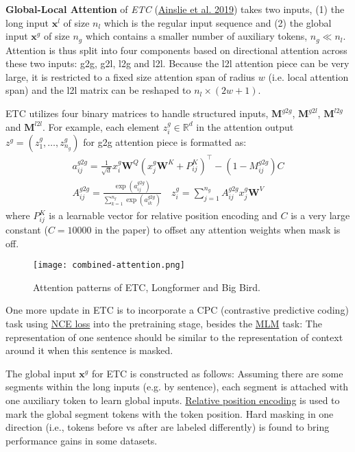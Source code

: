 \documentclass[12pt]{article}
\begin{document}
\textbf{Global-Local Attention} of \emph{ETC} (\href{https://aclanthology.org/2020.emnlp-main.19/}{Ainslie et al. 2019}) takes two inputs, (1) the long input $\mathbf{x}^l$ of size $n_l$ which is the regular input sequence and (2) the global input $\mathbf{x}^g$ of size $n_g$ which contains a smaller number of auxiliary tokens, $n_g \ll n_l$. Attention is thus split into four components based on directional attention across these two inputs: g2g, g2l, l2g and l2l. Because the l2l attention piece can be very large, it is restricted to a fixed size attention span of radius $w$ (i.e. local attention span) and the l2l matrix can be reshaped to $n_l \times (2w+1)$.

ETC utilizes four binary matrices to handle structured inputs, $\mathbf{M}^{g2g}$, $\mathbf{M}^{g2l}$, $\mathbf{M}^{l2g}$ and $\mathbf{M}^{l2l}$. For example, each element $z^g_i \in \mathbb{R}^d$ in the attention output $z^g = (z^g_1, \dots, z^g_{n_g})$ for g2g attention piece is formatted as:
\[
\begin{aligned}
a^{g2g}_{ij} = \frac{1}{\sqrt{d}} x^g_i \mathbf{W}^Q (x^g_j \mathbf{W}^K + P^K_{ij})^\top - (1- M^{g2g}_{ij})C \\
A^{g2g}_{ij} = \frac{\exp(a^{g2g}_{ij})}{\sum_{k=1}^{n_g} \exp(a^{g2g}_{ik})} \quad
z^g_i = \sum^{n_g}_{j=1} A^{g2g}_{ij} x^g_j \mathbf{W}^V
\end{aligned}
\]
where $P^K_{ij}$ is a learnable vector for relative position encoding and $C$ is a very large constant ($C=10000$ in the paper) to offset any attention weights when mask is off.

\begin{figure}[h!]
    \centering
    \texttt{[image: combined-attention.png]}
    \caption{Attention patterns of ETC, Longformer and Big Bird.}
\end{figure}

One more update in ETC is to incorporate a CPC (contrastive predictive coding) task using \href{https://lilianweng.github.io/posts/2021-05-31-contrastive/#nce}{NCE loss} into the pretraining stage, besides the \href{https://lilianweng.github.io/posts/2019-01-31-lm/#MLM}{MLM} task: The representation of one sentence should be similar to the representation of context around it when this sentence is masked.

The global input $\mathbf{x}^g$ for ETC is constructed as follows: Assuming there are some segments within the long inputs (e.g. by sentence), each segment is attached with one auxiliary token to learn global inputs. \href{#relative-position-encoding}{Relative position encoding} is used to mark the global segment tokens with the token position. Hard masking in one direction (i.e., tokens before vs after are labeled differently) is found to bring performance gains in some datasets.
\end{document}
